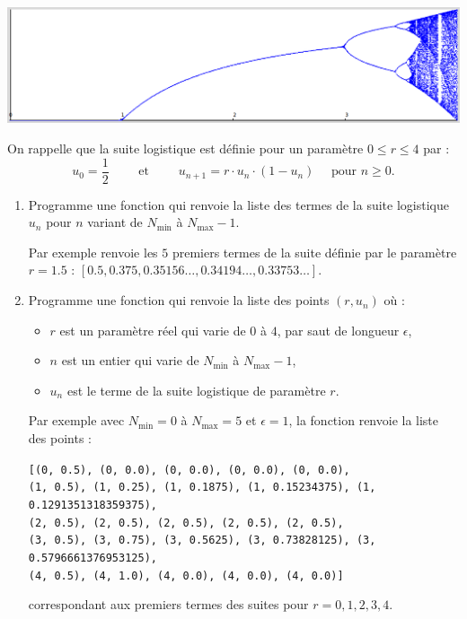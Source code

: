 \documentclass[11pt,class=report,crop=false]{standalone}
\begin{document}
\begin{activite}[]


\begin{center}
\includegraphics[scale=\myscale,scale=0.3]{ecran-lyapunov-1}
\end{center}

On rappelle que la suite logistique est définie pour un paramètre $0\le r \le 4$ par :
$$u_0 = \frac12 
\qquad \text{ et } \qquad
u_{n+1} = r \cdot u_n \cdot (1-u_n) \quad \text{ pour } n\ge0.$$

\begin{enumerate}
  \item Programme une fonction  qui renvoie la liste des termes de la suite logistique $u_n$ pour $n$ variant de $N_{\min}$ à $N_{{\max}}-1$.
  
  Par exemple   renvoie les $5$ premiers termes de la suite définie par le paramètre $r=1.5$ : $[0.5, 0.375, 0.35156\ldots, 0.34194\ldots, 0.33753\ldots]$.
  
  
  \item  Programme une fonction  qui renvoie la liste des points $(r,u_n)$ où :
  \begin{itemize}
    \item $r$ est un paramètre réel qui varie de $0$ à $4$, par saut de longueur $\epsilon$,
    \item $n$ est un entier qui varie de $N_{\min}$ à $N_{{\max}}-1$,
    \item $u_n$ est le terme de la suite logistique de paramètre $r$.
  \end{itemize}
  
  Par exemple avec $N_{\min} = 0$ à $N_{\max} = 5$ et $\epsilon = 1$, la fonction  renvoie la liste des points :

\begin{center}  
  \texttt{[(0, 0.5), (0, 0.0), (0, 0.0), (0, 0.0), (0, 0.0), \\
  (1, 0.5), (1, 0.25), (1, 0.1875), (1, 0.15234375), (1, 0.1291351318359375), \\
  (2, 0.5), (2, 0.5), (2, 0.5), (2, 0.5), (2, 0.5), \\
  (3, 0.5), (3, 0.75), (3, 0.5625), (3, 0.73828125), (3, 0.5796661376953125), \\
  (4, 0.5), (4, 1.0), (4, 0.0), (4, 0.0), (4, 0.0)]
  }
\end{center}
correspondant aux premiers termes des suites pour $r=0,1,2,3,4$.


\end{enumerate}
\end{activite}
\end{document}
